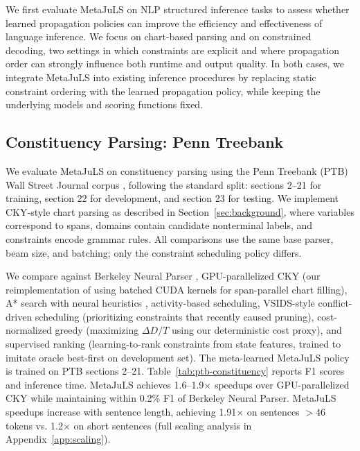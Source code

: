 \documentclass[11pt]{article}
\begin{document}
We first evaluate MetaJuLS on NLP structured inference tasks to assess whether learned propagation policies can improve the efficiency and effectiveness of language inference. We focus on chart-based parsing and on constrained decoding, two settings in which constraints are explicit and where propagation order can strongly influence both runtime and output quality. In both cases, we integrate MetaJuLS into existing inference procedures by replacing static constraint ordering with the learned propagation policy, while keeping the underlying models and scoring functions fixed.

\subsection{Constituency Parsing: Penn Treebank}

We evaluate MetaJuLS on constituency parsing using the Penn Treebank (PTB) Wall Street Journal corpus \citep{marcus1993building}, following the standard split: sections 2--21 for training, section 22 for development, and section 23 for testing. We implement CKY-style chart parsing as described in Section~\ref{sec:background}, where variables correspond to spans, domains contain candidate nonterminal labels, and constraints encode grammar rules. All comparisons use the same base parser, beam size, and batching; only the constraint scheduling policy differs.

We compare against Berkeley Neural Parser \citep{kitaev2018constituency}, GPU-parallelized CKY (our reimplementation of \citet{klein2003accurate} using batched CUDA kernels for span-parallel chart filling), A* search with neural heuristics \citep{stern2017minimum}, activity-based scheduling, VSIDS-style conflict-driven scheduling (prioritizing constraints that recently caused pruning), cost-normalized greedy (maximizing $\Delta D / T$ using our deterministic cost proxy), and supervised ranking (learning-to-rank constraints from state features, trained to imitate oracle best-first on development set). The meta-learned MetaJuLS policy is trained on PTB sections 2--21. Table~\ref{tab:ptb-constituency} reports F1 scores and inference time. MetaJuLS achieves 1.6--1.9$\times$ speedups over GPU-parallelized CKY while maintaining within 0.2\% F1 of Berkeley Neural Parser. MetaJuLS speedups increase with sentence length, achieving 1.91$\times$ on sentences $>46$ tokens vs. 1.2$\times$ on short sentences (full scaling analysis in Appendix~\ref{app:scaling}).
\end{document}
